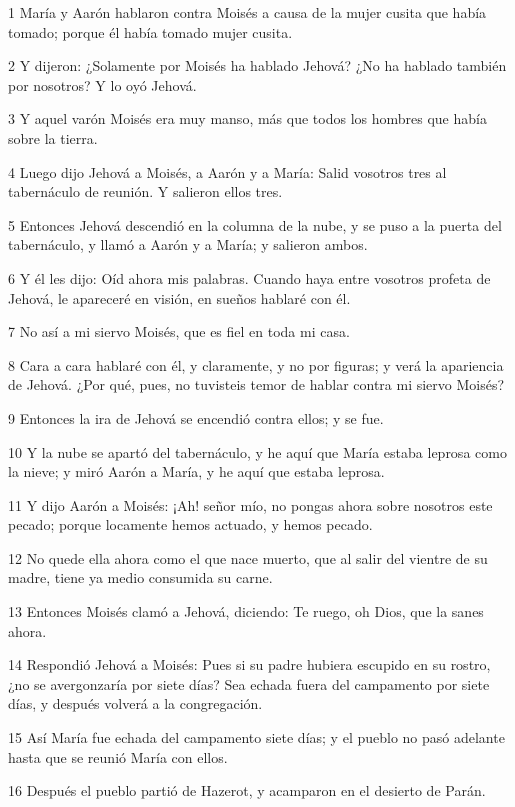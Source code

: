 \par 1 María y Aarón hablaron contra Moisés a causa de la mujer cusita que había tomado; porque él había tomado mujer cusita.
\par 2 Y dijeron: ¿Solamente por Moisés ha hablado Jehová? ¿No ha hablado también por nosotros? Y lo oyó Jehová.
\par 3 Y aquel varón Moisés era muy manso, más que todos los hombres que había sobre la tierra.
\par 4 Luego dijo Jehová a Moisés, a Aarón y a María: Salid vosotros tres al tabernáculo de reunión. Y salieron ellos tres.
\par 5 Entonces Jehová descendió en la columna de la nube, y se puso a la puerta del tabernáculo, y llamó a Aarón y a María; y salieron ambos. 
\par 6 Y él les dijo: Oíd ahora mis palabras. Cuando haya entre vosotros profeta de Jehová, le apareceré en visión, en sueños hablaré con él.
\par 7 No así a mi siervo Moisés, que es fiel en toda mi casa.
\par 8 Cara a cara hablaré con él, y claramente, y no por figuras; y verá la apariencia de Jehová. ¿Por qué, pues, no tuvisteis temor de hablar contra mi siervo Moisés?
\par 9 Entonces la ira de Jehová se encendió contra ellos; y se fue.
\par 10 Y la nube se apartó del tabernáculo, y he aquí que María estaba leprosa como la nieve; y miró Aarón a María, y he aquí que estaba leprosa.
\par 11 Y dijo Aarón a Moisés: ¡Ah! señor mío, no pongas ahora sobre nosotros este pecado; porque locamente hemos actuado, y hemos pecado.
\par 12 No quede ella ahora como el que nace muerto, que al salir del vientre de su madre, tiene ya medio consumida su carne.
\par 13 Entonces Moisés clamó a Jehová, diciendo: Te ruego, oh Dios, que la sanes ahora.
\par 14 Respondió Jehová a Moisés: Pues si su padre hubiera escupido en su rostro, ¿no se avergonzaría por siete días? Sea echada fuera del campamento por siete días, y después volverá a la congregación.
\par 15 Así María fue echada del campamento siete días; y el pueblo no pasó adelante hasta que se reunió María con ellos.
\par 16 Después el pueblo partió de Hazerot, y acamparon en el desierto de Parán.

